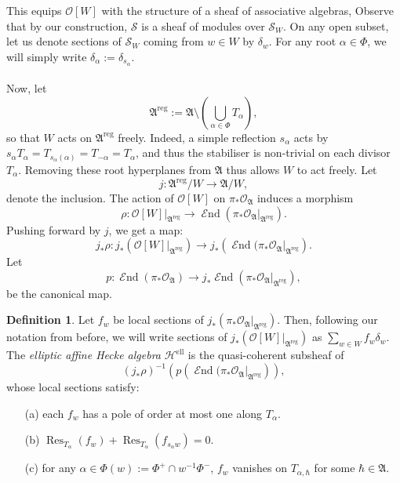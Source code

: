 \documentclass[a4paper]{report}
\theoremstyle{theorem}
\theoremstyle{definition}
\newtheorem{definition}{Definition}
\theoremstyle{remark}
\theoremstyle{proposition}
\theoremstyle{conjecture}
\theoremstyle{lemma}
\theoremstyle{corollary}
\theoremstyle{exercise}
\theoremstyle{example}
\newcommand{\mcal}{\mathcal}
\newcommand{\on}{\operatorname}
\begin{document}
  This equips $\mcal{O}[W]$ with the structure of a sheaf of associative algebras,
  Observe that by our construction, $\mcal{S}$ 
  is a sheaf of modules over $\mcal{S}_W$. On any open subset, let us denote 
  sections of $\mcal{S}_W$ coming from $w\in W$ by $\delta_w$. For any root 
  $\alpha \in \Phi$, we will simply write $\delta_\alpha := \delta_{s_\alpha}$.\\\\
  Now, let 
  $$\mathfrak{A}^{\on{reg}} := \mathfrak{A} \setminus \left(\bigcup_{\alpha\in\Phi} T_\alpha\right),$$
  so that $W$ acts on $\mathfrak{A}^{\on{reg}}$ freely. Indeed, a simple reflection $s_\alpha$ acts by 
  $s_\alpha T_\alpha = T_{s_\alpha(\alpha)} = T_{-\alpha} = T_\alpha$, and thus the stabiliser is non-trivial 
  on each divisor $T_\alpha$. Removing these root hyperplanes from $\mathfrak{A}$ thus allows $W$ to act freely.
  Let $$j : \mathfrak{A}^{\on{reg}}/W \longrightarrow \mathfrak{A}/W,$$
  denote the inclusion. The action of $\mcal{O}[W]$ on $\pi_\ast\mcal{O}_{\mathfrak{A}}$ induces a morphism 
  $$\rho : \mcal{O}[W]\vert_{\mathfrak{A}^{\on{reg}}} \longrightarrow \on{\mathscr{E}nd}(\pi_\ast\mcal{O}_{\mathfrak{A}}\vert_{\mathfrak{A}^{\on{reg}}}).$$
  Pushing forward by $j$, we get a map:
  $$j_\ast \rho : j_\ast\left( \mcal{O}[W]\vert_{\mathfrak{A}^{\on{reg}}}\right) \longrightarrow j_\ast\left(\on{\mathscr{E}nd}(\pi_\ast\mcal{O}_{\mathfrak{A}}\vert_{\mathfrak{A}^{\on{reg}}}\right).$$
  Let $$p : \on{\mathscr{E}nd}(\pi_\ast\mcal{O}_{\mathfrak{A}}) \longrightarrow j_\ast\on{\mathscr{E}nd}(\pi_\ast\mcal{O}_{\mathfrak{A}}\vert_{\mathfrak{A}^{\on{reg}}}),$$
  be the canonical map.
  \begin{definition}\label{def_ellaha}
      Let $f_w$ be local sections of $j_\ast(\pi_\ast\mcal{O}_{\mathfrak{A}}\vert_{\mathfrak{A}^{\on{reg}}})$. Then, following our notation from before, 
      we will write sections of $j_\ast(\mcal{O}[W]\vert_{\mathfrak{A}^{\on{reg}}})$
      as $\sum_{w\in W} f_w\delta_w$.
      The \emph{elliptic affine Hecke algebra} $\mcal{H}^{\on{ell}}$ is 
      the quasi-coherent subsheaf of 
      $$(j_\ast\rho)^{-1}\left(p\left(\on{\mathscr{E}nd}(\pi_\ast\mcal{O}_{\mathfrak{A}}\vert_{\mathfrak{A}^{\on{reg}}}\right)\right),$$
      whose local sections satisfy:
      \begin{itemize}
          \item[(a)] each $f_w$ has a pole of order at most one along $T_\alpha$. 
          \item[(b)] $\on{Res}_{T_\alpha}(f_w) + \on{Res}_{T_\alpha}(f_{s_\alpha w}) = 0$.
          \item[(c)] for any $\alpha \in \Phi(w) := \Phi^+ \cap w^{-1}\Phi^-$, $f_w$ vanishes on $T_{\alpha,\hbar}$
          for some $\hbar \in \mathfrak{A}$.
      \end{itemize}
  \end{definition}
  
\end{document}
